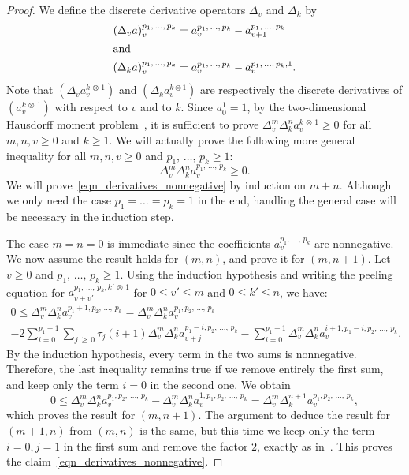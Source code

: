 \documentclass[AHL,Unicode,longabstracts,published]{cedram}
\begin{document}
\begin{proof}
We define the discrete derivative operators $\Delta_v$ and $\Delta_k$ by
\begin{align*}
\left(\Delta_v a \right)_v^{p_1,\, \dots,\,p_k} &= a^{p_1,\,\dots,\,p_k}_v - a^{p_1,\,\dots,\,p_k}_{v+1}
\\
\intertext{and}
\left(\Delta_k a \right)_v^{p_1,\,\dots,\,p_k} &= a^{p_1,\,\dots,\,p_k}_v - a^{p_1,\,\dots,\,p_k,1}_{v}.
\end{align*}
Note that $(\Delta_v a^{k\, \otimes\,1}_v)$ and $(\Delta_k a^{k \otimes 1}_v)$ are respectively the discrete derivatives of $(a^{k\,\otimes\,1}_v )$ with respect to $v$ and to $k$. Since $a_0^1=1$, by the two-dimensional Hausdorff moment problem~\cite{HS33}, it is sufficient to prove $\Delta_v^{m} \Delta_k^n a_v^{k\,\otimes\,1} \geq 0$ for all $m,n,v \geq 0$ and $k \geq 1$. We will actually prove the following more general inequality for all $m,n,v \geq 0$ and $p_1,\,\dots,\,p_k \geq 1$:
\begin{equation}\label{eqn_derivatives_nonnegative}
\Delta_v^m \Delta_k^n a_v^{p_1,\,\dots,\,p_k} \geq 0.
\end{equation}
We will prove~\eqref{eqn_derivatives_nonnegative} by induction on $m+n$. Although we only need the case $p_1=\dots=p_k=1$ in the end, handling the general case will be necessary in the induction step.

The case $m=n=0$ is immediate since the coefficients $a_v^{p_1,\,\dots,\,p_k}$ are nonnegative. We now assume the result holds for $(m,n)$, and prove it for $(m,n+1)$. Let $v \geq 0$ and $p_1,\,\dots,\,p_k \geq 1$. Using the induction hypothesis and writing the peeling equation for $a_{v+v'}^{p_1,\,\dots,\,p_k, k' \,\otimes\,1}$ for $0 \leq v' \leq m$ and $0 \leq k' \leq n$, we have:
\begin{multline*}
0  \leq \Delta^m_v \Delta_k^n a_v^{p_1+1, p_2, \,\dots,\,p_k}
= \Delta^m_v \Delta_k^n a_v^{p_1, p_2,\,\dots, \,p_k} \\-2 \sum_{i=0}^{p_1-1} \sum_{j\,\geq\,0} \tau_j(i+1) \Delta^m_v \Delta_k^n a_{v+j}^{p_1-i, p_2,\,\dots,\,p_k} - \sum_{i=0}^{p_1-1} \Delta^m_v \Delta_k^n a_v^{i+1, p_1-i, p_2,\,\dots,\,p_k}.
\end{multline*}
By the induction hypothesis, every term in the two sums is nonnegative. Therefore, the last inequality remains true if we remove entirely the first sum, and keep only the term $i=0$ in the second one. We obtain
\[
0 \leq \Delta^m_v \Delta_k^n a_v^{p_1, p_2,\, \dots,\,p_k} - \Delta^m_v \Delta_k^n a_v^{1, p_1, p_2,\,\dots,\,p_k} = \Delta^m_v \Delta_k^{n+1} a_v^{p_1, p_2,\,\dots,\,p_k},
\]
which proves the result for $(m,n+1)$. The argument to deduce the result for $(m+1,n)$ from $(m,n)$ is the same, but this time we keep only the term $i=0, j=1$ in the first sum and remove the factor $2$, exactly as in~\cite[Lemma~16]{BL19}. This proves the claim~\eqref{eqn_derivatives_nonnegative}.


\end{proof}
\end{document}
